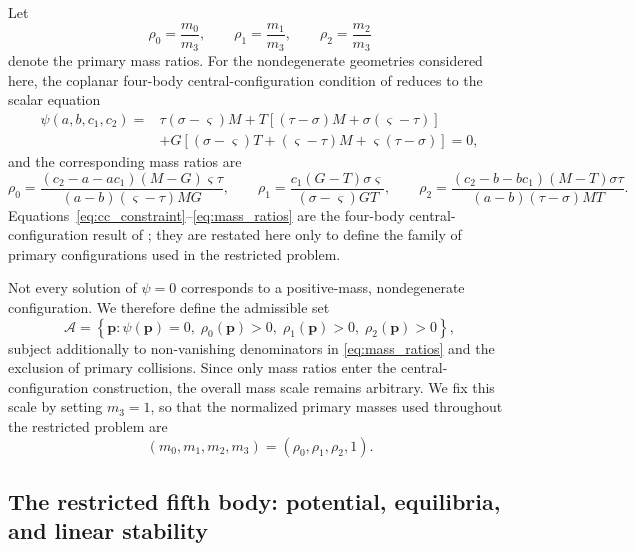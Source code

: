 Let
\[
\rho_0=\frac{m_0}{m_3},\qquad
\rho_1=\frac{m_1}{m_3},\qquad
\rho_2=\frac{m_2}{m_3}
\]
denote the primary mass ratios. For the nondegenerate geometries considered
here, the coplanar four-body central-configuration condition of
\cite{shoaib2023} reduces to the scalar equation
\begin{equation}
\begin{aligned}
\psi(a,b,c_1,c_2)
={}&
\tau(\sigma-\varsigma)M
+T\left[(\tau-\sigma)M+\sigma(\varsigma-\tau)\right]
\\
&+
G\left[(\sigma-\varsigma)T+(\varsigma-\tau)M
+\varsigma(\tau-\sigma)\right]
=0,
\end{aligned}
\label{eq:cc_constraint}
\end{equation}
and the corresponding mass ratios are
\begin{equation}
\rho_0=
\frac{(c_2-a-ac_1)(M-G)\varsigma\tau}
     {(a-b)(\varsigma-\tau)MG},
\qquad
\rho_1=
\frac{c_1(G-T)\sigma\varsigma}
     {(\sigma-\varsigma)GT},
\qquad
\rho_2=
\frac{(c_2-b-bc_1)(M-T)\sigma\tau}
     {(a-b)(\tau-\sigma)MT}.
\label{eq:mass_ratios}
\end{equation}
Equations~\eqref{eq:cc_constraint}--\eqref{eq:mass_ratios} are the
four-body central-configuration result of \cite{shoaib2023}; they are
restated here only to define the family of primary configurations used in
the restricted problem.

Not every solution of $\psi=0$ corresponds to a positive-mass,
nondegenerate configuration. We therefore define the admissible set
\begin{equation}
\mathcal A=
\left\{
\mathbf p:
\psi(\mathbf p)=0,\;
\rho_0(\mathbf p)>0,\;
\rho_1(\mathbf p)>0,\;
\rho_2(\mathbf p)>0
\right\},
\label{eq:admissible_set}
\end{equation}
subject additionally to non-vanishing denominators in
\eqref{eq:mass_ratios} and the exclusion of primary collisions. Since only
mass ratios enter the central-configuration construction, the overall mass
scale remains arbitrary. We fix this scale by setting $m_3=1$, so that the
normalized primary masses used throughout the restricted problem are
\[
(m_0,m_1,m_2,m_3)=(\rho_0,\rho_1,\rho_2,1).
\]

\subsection{The restricted fifth body: potential, equilibria, and linear stability}
\label{subsec:potential}

